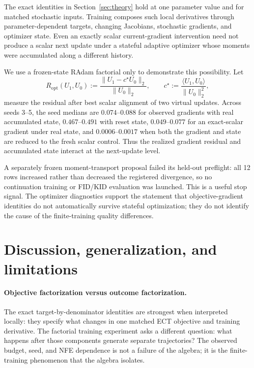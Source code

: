 \documentclass{article}
\newif\ifshowcomments
\newcommand{\claimnote}[1]{%
  \ifshowcomments{\color{claimpurple}\textbf{[CLAIM CEILING: #1]}}\fi}
\newcommand{\Ropt}{R_{\mathrm{opt}}}
\begin{document}
The exact identities in Section~\ref{sec:theory} hold at one parameter value
and for matched stochastic inputs. Training composes such local derivatives
through parameter-dependent targets, changing Jacobians, stochastic gradients,
and optimizer state. Even an exactly scalar current-gradient intervention need
not produce a scalar next update under a stateful adaptive optimizer whose
moments were accumulated along a different history.

We use a frozen-state RAdam factorial only to demonstrate this possibility.
Let
\begin{equation}
  \Ropt(U_1,U_0)
  :=\frac{\lVert U_1-c^\star U_0\rVert_2}{\lVert U_0\rVert_2},
  \qquad
  c^\star:=\frac{\langle U_1,U_0\rangle}{\lVert U_0\rVert_2^2},
  \label{eq:optimizer-residual}
\end{equation}
measure the residual after best scalar alignment of two virtual updates.
Across seeds 3--5, the seed medians are $0.074$--$0.088$ for observed
gradients with real accumulated state, $0.467$--$0.491$ with reset state,
$0.049$--$0.077$ for an exact-scalar gradient under real state, and
$0.0006$--$0.0017$ when both the gradient and state are reduced to the
fresh scalar control. Thus the realized gradient residual and accumulated
state interact at the next-update level.

A separately frozen moment-transport proposal failed its held-out preflight:
all 12 rows increased rather than decreased the registered divergence, so no
continuation training or FID/KID evaluation was launched. This is a useful
stop signal. The optimizer diagnostics support the statement that
objective-gradient identities do not automatically survive stateful
optimization; they do not identify the cause of the finite-training quality
differences.

\claimnote{Keep this section compact. PR65 is a next-update diagnostic and
PR66 is a NO-GO result. Neither is endpoint mechanism closure.}

\section{Discussion, generalization, and limitations}
\label{sec:discussion}

\paragraph{Objective factorization versus outcome factorization.}
The exact target-by-denominator identities are strongest when interpreted
locally: they specify what changes in one matched ECT objective and training
derivative. The factorial training experiment asks a different question:
what happens after those components generate separate trajectories? The
observed budget, seed, and NFE dependence is not a failure of the algebra; it
is the finite-training phenomenon that the algebra isolates.
\end{document}
